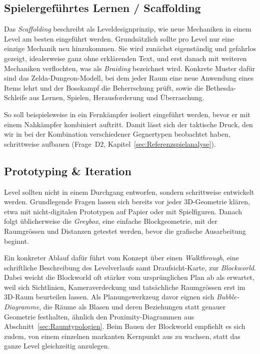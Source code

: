 \documentclass[../Main.tex]{subfiles}
\begin{document}
\subsection{Spielergeführtes Lernen / Scaffolding} \label{sec:Scaffolding}
Das \textit{Scaffolding} beschreibt als Leveldesignprinzip, wie neue Mechaniken in einem Level am besten eingeführt werden.\autocite{totten2014architectural} Grundsätzlich sollte pro Level nur eine einzige Mechanik neu hinzukommen.\autocite{gdc_tenprinciples2010} Sie wird zunächst eigenständig und gefahrlos gezeigt, idealerweise ganz ohne erklärenden Text, und erst danach mit weiteren Mechaniken verflochten, was als \textit{Braiding} bezeichnet wird.\autocite{gdc_movingmountains2020} Konkrete Muster dafür sind das Zelda-Dungeon-Modell, bei dem jeder Raum eine neue Anwendung eines Items lehrt und der Bosskampf die Beherrschung prüft, sowie die Bethesda-Schleife aus Lernen, Spielen, Herausforderung und Überraschung.\autocite{gdc_tenprinciples2010}

So soll beispielsweise in  ein Fernkämpfer isoliert eingeführt werden, bevor er mit einem Nahkämpfer kombiniert auftritt. Damit lässt sich der taktische Druck, den wir in  bei der Kombination verschiedener Gegnertypen beobachtet haben, schrittweise aufbauen (Frage~D2, Kapitel~\ref{sec:Referenzspielanalyse}).

\subsection{Prototyping \& Iteration} \label{sec:Prototyping}
Level sollten nicht in einem Durchgang entworfen, sondern schrittweise entwickelt werden. Grundlegende Fragen lassen sich bereits vor jeder 3D-Geometrie klären, etwa mit nicht-digitalen Prototypen auf Papier oder mit Spielfiguren. Danach folgt üblicherweise die \textit{Greybox}, eine einfache Blockgeometrie, mit der Raumgrössen und Distanzen getestet werden, bevor die grafische Ausarbeitung beginnt.\autocite{totten2014architectural}

Ein konkreter Ablauf dafür führt vom Konzept über einen \textit{Walkthrough}, eine schriftliche Beschreibung des Levelverlaufs samt Draufsicht-Karte, zur \textit{Blockworld}. Dabei weicht die Blockworld oft stärker vom ursprünglichen Plan ab als erwartet, weil sich Sichtlinien, Kameraverdeckung und tatsächliche Raumgrössen erst im 3D-Raum beurteilen lassen. Als Planungswerkzeug davor eignen sich \textit{Bubble-Diagramme}, die Räume als Blasen und deren Beziehungen statt genauer Geometrie festhalten, ähnlich den Proximity-Diagrammen aus Abschnitt~\ref{sec:Raumtypologien}. Beim Bauen der Blockworld empfiehlt es sich zudem, von einem einzelnen markanten Kernpunkt aus zu wachsen, statt das ganze Level gleichzeitig anzulegen.\autocite{gdc_leveldesignaday2020}
\end{document}
